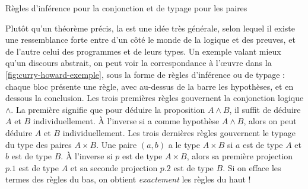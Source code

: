 \begin{marginfigure}[2em]




  
  \caption{Règles d’inférence pour la conjonction et de typage pour les paires}
  \label{fig:curry-howard-exemple}
\end{marginfigure}

Plutôt qu’un théorème précis, la  est une
idée très générale,
selon lequel il existe une ressemblance forte entre d’un côté le monde de la
logique et des preuves, et de l’autre celui des programmes et de leurs types.
Un exemple valant mieux qu’un discours abstrait, on peut voir la correspondance à l’œuvre dans la \cref{fig:curry-howard-exemple}, sous la forme de règles d’inférence
ou de typage : chaque bloc présente une règle, avec au-dessus de la barre les
hypothèses, et en dessous la conclusion.
Les trois premières règles gouvernent la conjonction logique $\wedge$.
La première signifie que pour déduire la proposition $A \wedge B$,
il suffit de déduire $A$ et $B$ individuellement.
À l’inverse si a comme hypothèse $A \wedge B$, alors on peut déduire $A$ et $B$
individuellement.
Les trois dernières règles gouvernent le typage du type des paires $A \times B$.
Une paire $(a,b)$ a le type $A \times B$ si $a$ est de type $A$ et $b$
est de type $B$.
À l’inverse si $p$ est de type $A \times B$, alors sa première projection $p.1$
est de type $A$ et sa seconde projection $p.2$ est de type $B$.
Si on efface les termes des règles du bas, on obtient \emph{exactement} les règles du haut !

